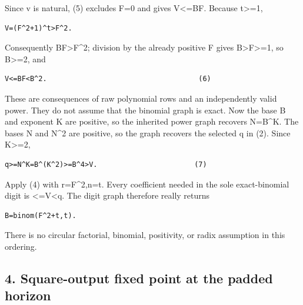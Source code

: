 Since v is natural, (5) excludes F=\allowbreak{}0 and gives V\textless{}\allowbreak{}=\allowbreak{}BF. Because t\textgreater{}\allowbreak{}=\allowbreak{}1,



\begin{verbatim}
V=(F^2+1)^t>F^2.
\end{verbatim}

Consequently BF\textgreater{}\allowbreak{}F\textasciicircum{}\allowbreak{}2; division by the already positive F gives B\textgreater{}\allowbreak{}F\textgreater{}\allowbreak{}=\allowbreak{}1, so B\textgreater{}\allowbreak{}=\allowbreak{}2, and



\begin{verbatim}
V<=BF<B^2.                                    (6)
\end{verbatim}

These are consequences of raw polynomial rows and an independently valid power. They do not assume that the binomial graph is exact. Now the base B and exponent K are positive, so the inherited power graph recovers N=\allowbreak{}B\textasciicircum{}\allowbreak{}K. The bases N and N\textasciicircum{}\allowbreak{}2 are positive, so the graph recovers the selected q in (2). Since K\textgreater{}\allowbreak{}=\allowbreak{}2,



\begin{verbatim}
q>=N^K=B^(K^2)>=B^4>V.                       (7)
\end{verbatim}

Apply (4) with r=\allowbreak{}F\textasciicircum{}\allowbreak{}2,n=\allowbreak{}t. Every coefficient needed in the sole exact-binomial digit is \textless{}\allowbreak{}=\allowbreak{}V\textless{}\allowbreak{}q. The digit graph therefore really returns



\begin{verbatim}
B=binom(F^2+t,t).
\end{verbatim}

There is no circular factorial, binomial, positivity, or radix assumption in this ordering.



\subsection*{4. Square-output fixed point at the padded horizon}



